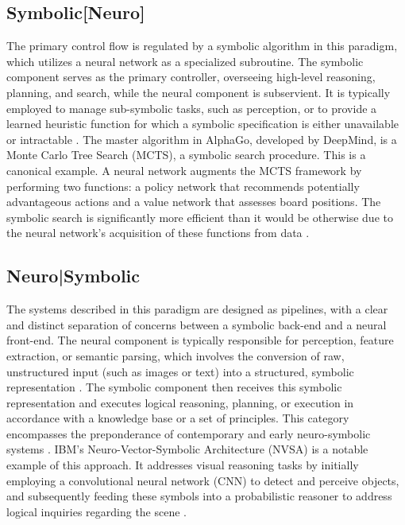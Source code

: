\documentclass[12pt, a4paper]{report}
\begin{document}
\subsection{Symbolic[Neuro]}
The primary control flow is regulated by a symbolic algorithm in this paradigm, which utilizes a neural network as a specialized subroutine. The symbolic component serves as the primary controller, overseeing high-level reasoning, planning, and search, while the neural component is subservient. It is typically employed to manage sub-symbolic tasks, such as perception, or to provide a learned heuristic function for which a symbolic specification is either unavailable or intractable \citep{chaudhuri2021neurosymbolic}. The master algorithm in AlphaGo, developed by DeepMind, is a Monte Carlo Tree Search (MCTS), a symbolic search procedure. This is a canonical example. A neural network augments the MCTS framework by performing two functions: a policy network that recommends potentially advantageous actions and a value network that assesses board positions. The symbolic search is significantly more efficient than it would be otherwise due to the neural network's acquisition of these functions from data \citep{chaudhuri2021neurosymbolic}.


\subsection{Neuro|Symbolic}

The systems described in this paradigm are designed as pipelines, with a clear and distinct separation of concerns between a symbolic back-end and a neural front-end. The neural component is typically responsible for perception, feature extraction, or semantic parsing, which involves the conversion of raw, unstructured input (such as images or text) into a structured, symbolic representation \citep{cranmer2020interpretable}. The symbolic component then receives this symbolic representation and executes logical reasoning, planning, or execution in accordance with a knowledge base or a set of principles. This category encompasses the preponderance of contemporary and early neuro-symbolic systems \citep{chaudhuri2021neurosymbolic}. IBM's Neuro-Vector-Symbolic Architecture (NVSA) is a notable example of this approach. It addresses visual reasoning tasks by initially employing a convolutional neural network (CNN) to detect and perceive objects, and subsequently feeding these symbols into a probabilistic reasoner to address logical inquiries regarding the scene \citep{chaudhuri2021neurosymbolic}.
\end{document}
